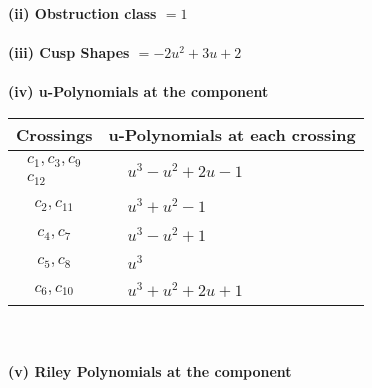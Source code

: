 \documentclass[1p]{elsarticle_modified}
\theoremstyle{definition}
\begin{document}
\flushleft \textbf{(ii) Obstruction class $= 1$}\\~\\
\flushleft \textbf{(iii) Cusp Shapes $= -2 u^2+3 u+2$}\\~\\
\newpage\renewcommand{\arraystretch}{1}
\flushleft \textbf{(iv) u-Polynomials at the component}\newline \\
\begin{tabular}{m{50pt}|m{274pt}}
Crossings & \hspace{64pt}u-Polynomials at each crossing \\
\hline $$\begin{aligned}c_{1},c_{3},c_{9}\\c_{12}\end{aligned}$$&$\begin{aligned}
&u^3- u^2+2 u-1
\end{aligned}$\\
\hline $$\begin{aligned}c_{2},c_{11}\end{aligned}$$&$\begin{aligned}
&u^3+u^2-1
\end{aligned}$\\
\hline $$\begin{aligned}c_{4},c_{7}\end{aligned}$$&$\begin{aligned}
&u^3- u^2+1
\end{aligned}$\\
\hline $$\begin{aligned}c_{5},c_{8}\end{aligned}$$&$\begin{aligned}
&u^3
\end{aligned}$\\
\hline $$\begin{aligned}c_{6},c_{10}\end{aligned}$$&$\begin{aligned}
&u^3+u^2+2 u+1
\end{aligned}$\\
\hline
\end{tabular}\\~\\
\newpage\renewcommand{\arraystretch}{1}
\flushleft \textbf{(v) Riley Polynomials at the component}\newline \\
\end{document}
